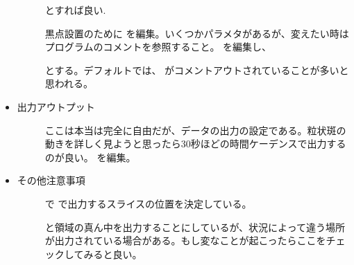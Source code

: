 \documentclass[letterpaper,10pt,dvipdfmx,report]{sphinxmanual}
\begin{document}
\begin{itemize}
\begin{description}
\begin{sphinxVerbatim}[commandchars=\\\{\}]
  
  
  
\end{sphinxVerbatim}

とすれば良い.

黒点設置のために  を編集。いくつかパラメタがあるが、変えたい時はプログラムのコメントを参照すること。  を編集し、

\begin{sphinxVerbatim}[commandchars=\\\{\}]
  
       
\end{sphinxVerbatim}

とする。デフォルトでは、  がコメントアウトされていることが多いと思われる。

\end{description}

\item {} \begin{description}
\item[{出力アウトプット}] \leavevmode
ここは本当は完全に自由だが、データの出力の設定である。粒状斑の動きを詳しく見ようと思ったら30秒ほどの時間ケーデンスで出力するのが良い。
 を編集。

\begin{sphinxVerbatim}[commandchars=\\\{\}]
  
  
\end{sphinxVerbatim}

\end{description}

\item {} \begin{description}
\item[{その他注意事項}] \leavevmode
{} で  で出力するスライスの位置を決定している。

と領域の真ん中を出力することにしているが、状況によって違う場所が出力されている場合がある。もし変なことが起こったらここをチェックしてみると良い。

\end{description}

\end{itemize}
\end{document}
